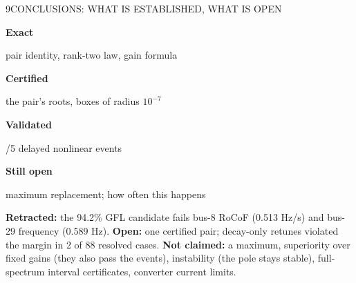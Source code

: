 \begin{minipage}[t][\PosterBottomRowHeight][t]{\PosterGridWidth}\vspace{0pt}
  \begin{PosterPanel}{\PosterBottomRowHeight}{9}{CONCLUSIONS: WHAT IS ESTABLISHED, WHAT IS OPEN}

    \noindent\begin{minipage}[c]{210mm}\centering
      {\MetricSize\bfseries\color{IASBlue}Exact\par}
      {\FigureSize pair identity, rank-two law, gain formula\par}
    \end{minipage}\hfill%
    \begin{minipage}[c]{205mm}\centering
      {\MetricSize\bfseries\color{IASBlue}Certified\par}
      {\FigureSize the pair's roots, boxes of radius $10^{-7}$\par}
    \end{minipage}\hfill%
    \begin{minipage}[c]{205mm}\centering
      {\MetricSize\bfseries\color{IASDarkGreen}Validated\par}
      {/5 delayed nonlinear events\par}
    \end{minipage}\hfill%
    \begin{minipage}[c]{225mm}\centering
      {\MetricSize\bfseries\color{IASGold!70!black}Still open\par}
      {\FigureSize maximum replacement; how often this happens\par}
    \end{minipage}\par
    \vspace{2mm}
    {\fontsize{22pt}{24.5pt}\selectfont \textbf{Retracted:} the 94.2\% GFL candidate fails bus-8 RoCoF (0.513 Hz/s) and bus-29 frequency (0.589 Hz). \textbf{Open:} one certified pair; decay-only retunes violated the margin in 2 of 88 resolved cases. \textbf{Not claimed:} a maximum, superiority over fixed gains (they also pass the events), instability (the pole stays stable), full-spectrum interval certificates, converter current limits.\par}

  \end{PosterPanel}
\end{minipage}%
